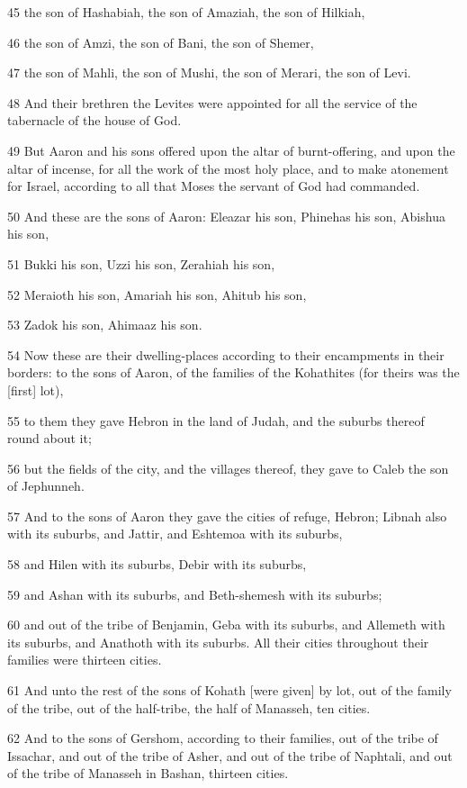 \par 45 the son of Hashabiah, the son of Amaziah, the son of Hilkiah,
\par 46 the son of Amzi, the son of Bani, the son of Shemer,
\par 47 the son of Mahli, the son of Mushi, the son of Merari, the son of Levi.
\par 48 And their brethren the Levites were appointed for all the service of the tabernacle of the house of God.
\par 49 But Aaron and his sons offered upon the altar of burnt-offering, and upon the altar of incense, for all the work of the most holy place, and to make atonement for Israel, according to all that Moses the servant of God had commanded.
\par 50 And these are the sons of Aaron: Eleazar his son, Phinehas his son, Abishua his son,
\par 51 Bukki his son, Uzzi his son, Zerahiah his son,
\par 52 Meraioth his son, Amariah his son, Ahitub his son,
\par 53 Zadok his son, Ahimaaz his son.
\par 54 Now these are their dwelling-places according to their encampments in their borders: to the sons of Aaron, of the families of the Kohathites (for theirs was the [first] lot),
\par 55 to them they gave Hebron in the land of Judah, and the suburbs thereof round about it;
\par 56 but the fields of the city, and the villages thereof, they gave to Caleb the son of Jephunneh.
\par 57 And to the sons of Aaron they gave the cities of refuge, Hebron; Libnah also with its suburbs, and Jattir, and Eshtemoa with its suburbs,
\par 58 and Hilen with its suburbs, Debir with its suburbs,
\par 59 and Ashan with its suburbs, and Beth-shemesh with its suburbs;
\par 60 and out of the tribe of Benjamin, Geba with its suburbs, and Allemeth with its suburbs, and Anathoth with its suburbs. All their cities throughout their families were thirteen cities.
\par 61 And unto the rest of the sons of Kohath [were given] by lot, out of the family of the tribe, out of the half-tribe, the half of Manasseh, ten cities.
\par 62 And to the sons of Gershom, according to their families, out of the tribe of Issachar, and out of the tribe of Asher, and out of the tribe of Naphtali, and out of the tribe of Manasseh in Bashan, thirteen cities.
